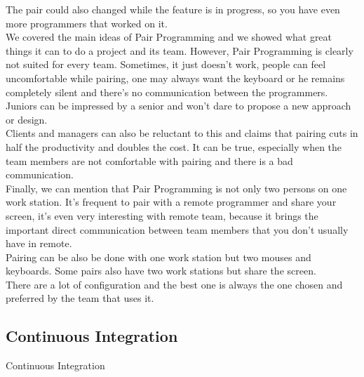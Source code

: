 The pair could also changed while the feature is in progress, so you
have even more programmers that worked on it. \\
\newline
We covered the main ideas of Pair Programming and we showed what great
things it can to do a project and its team.
However, Pair Programming is clearly not suited for every team.
Sometimes, it just doesn't work, people can feel uncomfortable while
pairing, one may always want the keyboard or he remains completely
silent and there's no communication between the programmers.
Juniors can be impressed by a senior and won't dare to propose a new
approach or design. \\
Clients and managers can also be reluctant to this and claims that
pairing cuts in half the productivity and doubles the cost.
It can be true, especially when the team members are not comfortable with
pairing and there is a bad communication. \\
\newline
Finally, we can mention that Pair Programming is not only two persons on
one work station.
It's frequent to pair with a remote programmer and share your screen,
it's even very interesting with remote team, because it brings the
important direct communication between team members that you don't
usually have in remote. \\
Pairing can be also be done with one work station but two mouses and
keyboards.
Some pairs also have two work stations but share the screen. \\
There are a lot of configuration and the best one is always the one
chosen and preferred by the team that uses it.

\subsection{Continuous Integration}\label{subsec:continuous-integration}
Continuous Integration
